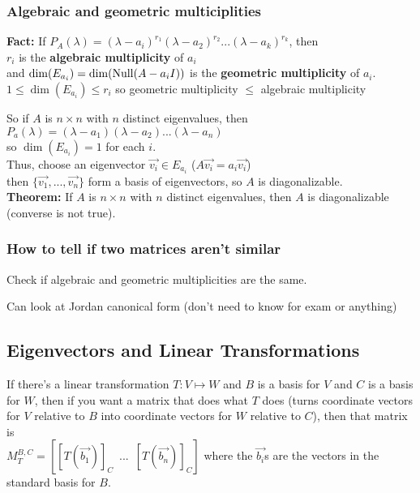 \subsubsection*{Algebraic and geometric multiciplities}

\textbf{Fact:} If $P_A(\lambda) = (\lambda - a_i)^{r_1}(\lambda - a_2)^{r_2}...(\lambda - a_k)^{r_k}$, then\\
$r_i$ is the \textbf{algebraic multiplicity} of $a_i$\\
and $\dim(E_{a_i}) = \dim(\operatorname{Null}(A-a_iI))$ is the \textbf{geometric multiplicity} of $a_i$.\\
$1 \leq \dim(E_{a_i}) \leq r_i$ so geometric multiplicity $\leq$ algebraic multiplicity

So if $A$ is $n \times n$ with $n$ distinct eigenvalues, then $P_a(\lambda) = (\lambda - a_1)(\lambda - a_2)...(\lambda - a_n)$\\
so $\dim(E_{a_i}) = 1$ for each $i$.\\
Thus, choose an eigenvector $\Vec{v_i} \in E_{a_i}$ ($A\Vec{v_i} = a_i\Vec{v_i}$)\\
then $\{\Vec{v_1}, ..., \Vec{v_n}\}$ form a basis of eigenvectors, so $A$ is diagonalizable.\\
\textbf{Theorem:} If $A$ is $n \times n$ with $n$ distinct eigenvalues, then $A$ is diagonalizable (converse is not true).

\subsubsection*{How to tell if two matrices aren't similar}

Check if algebraic and geometric multiplicities are the same.

Can look at Jordan canonical form (don't need to know for exam or anything)

\subsection{Eigenvectors and Linear Transformations}

If there's a linear transformation $T \colon V \mapsto W$ and $B$ is a basis for $V$ and $C$ is a basis for $W$, then if you want a matrix that does what $T$ does (turns coordinate vectors for $V$ relative to $B$ into coordinate vectors for $W$ relative to $C$), then that matrix is\\
$\displaystyle M_T^{B,C} = \left[[T(\Vec{b_1})]_C \,\,\, ...\,\,\, [T(\Vec{b_n})]_C\right]$ where the $\Vec{b_i}$s are the vectors in the standard basis for $B$.

